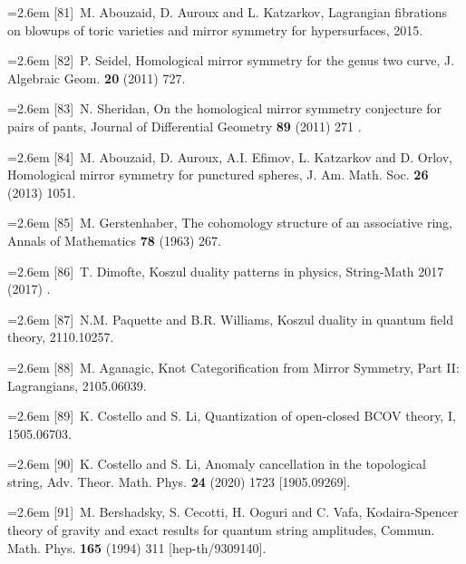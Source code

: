 \par\noindent\hangindent=2.6em [81]~M. Abouzaid, D. Auroux and L. Katzarkov, Lagrangian fibrations on blowups of toric varieties and mirror symmetry for hypersurfaces, 2015.

\par\noindent\hangindent=2.6em [82]~P. Seidel, Homological mirror symmetry for the genus two curve, J. Algebraic Geom. \textbf{20} (2011) 727.

\par\noindent\hangindent=2.6em [83]~N. Sheridan, On the homological mirror symmetry conjecture for pairs of pants, Journal of Differential Geometry \textbf{89} (2011) 271 .

\par\noindent\hangindent=2.6em [84]~M. Abouzaid, D. Auroux, A.I. Efimov, L. Katzarkov and D. Orlov, Homological mirror symmetry for punctured spheres, J. Am. Math. Soc. \textbf{26} (2013) 1051.

\par\noindent\hangindent=2.6em [85]~M. Gerstenhaber, The cohomology structure of an associative ring, Annals of Mathematics \textbf{78} (1963) 267.


\par\noindent\hangindent=2.6em [86]~T. Dimofte, Koszul duality patterns in physics, String-Math 2017 (2017) .

\par\noindent\hangindent=2.6em [87]~N.M. Paquette and B.R. Williams, Koszul duality in quantum field theory, 2110.10257.

\par\noindent\hangindent=2.6em [88]~M. Aganagic, Knot Categorification from Mirror Symmetry, Part II: Lagrangians, 2105.06039.

\par\noindent\hangindent=2.6em [89]~K. Costello and S. Li, Quantization of open-closed BCOV theory, I, 1505.06703.

\par\noindent\hangindent=2.6em [90]~K. Costello and S. Li, Anomaly cancellation in the topological string, Adv. Theor. Math. Phys. \textbf{24} (2020) 1723 [1905.09269].

\par\noindent\hangindent=2.6em [91]~M. Bershadsky, S. Cecotti, H. Ooguri and C. Vafa, Kodaira-Spencer theory of gravity and exact results for quantum string amplitudes, Commun. Math. Phys. \textbf{165} (1994) 311 [hep-th/9309140].

